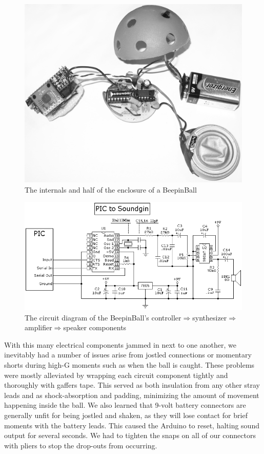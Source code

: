 \documentclass{nime-alternate}
\begin{document}
\begin{figure}[htbp]
	\centering
		\includegraphics[scale=0.45]{beepinball_bw} %
	\caption{The internals and half of the enclosure of a BeepinBall}
	\label{fig:beepinball}
\end{figure}

\begin{figure}[htbp]
	\centering
		\includegraphics[scale=0.31]{soundballcircuit} %
	\caption{The circuit diagram of the BeepinBall's controller$\Rightarrow$synthesizer$\Rightarrow$amplifier$\Rightarrow$speaker components}
	\label{fig:soundballcircuit}
\end{figure}

With this many electrical components jammed in next to one another, we 
inevitably had a number of issues arise from jostled connections or momentary
shorts during high-G moments such as when the ball is caught. These problems
were mostly alleviated by wrapping each circuit component tightly and 
thoroughly with gaffers tape. This served as both insulation from any other stray
leads and as shock-absorption and padding, minimizing the amount of movement
happening inside the ball. We also learned that 9-volt battery connectors are
generally unfit for being jostled and shaken, as they will lose contact
for brief moments with the battery leads. This caused the Arduino to
reset, halting sound output for several seconds. We had to tighten the snaps
on all of our connectors with pliers to stop the drop-outs from occurring.
\end{document}

